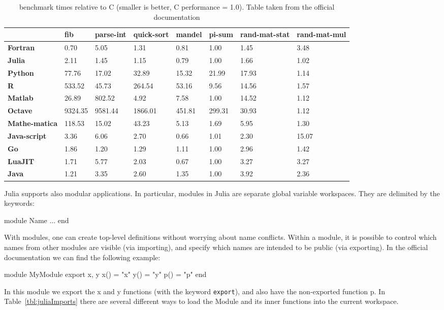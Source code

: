 \begin{table}[htb]
\centering
\caption[benchmark times relative to C]{benchmark times relative to C (smaller is better, C performance = 1.0). Table taken from the official documentation}
\label{tbl:JuliaBenchmark}
\begin{tabular}{p{1.2cm} | p{1.2cm} | p{1.3cm} | p{1.3cm} | p{1.3cm} | p{1cm} | p{1cm} | p{1cm}}
\toprule
&\textbf{fib}& \textbf{parse-int}&\textbf{quick-sort}& \textbf{mandel}&\textbf{pi-sum}& \textbf{rand-mat-stat}& \textbf{rand-mat-mul}\\ \midrule
\textbf{Fortran} 	& 0.70	& 5.05	& 1.31	& 0.81	& 1.00	& 1.45	& 3.48\\ \midrule
\textbf{Julia}		& 2.11	& 1.45	& 1.15	& 0.79	& 1.00	& 1.66	& 1.02\\ \midrule
\textbf{Python}         & 77.76	& 17.02	& 32.89	& 15.32	& 21.99	& 17.93	& 1.14\\ \midrule
\textbf{R}		&533.52	& 45.73	&264.54	& 53.16	& 9.56	& 14.56	& 1.57\\ \midrule
\textbf{Matlab}		& 26.89	&802.52	& 4.92	& 7.58	& 1.00	& 14.52	& 1.12\\ \midrule
\textbf{Octave}         &9324.35&9581.44&1866.01&451.81	&299.31	& 30.93	& 1.12\\ \midrule
\textbf{Mathe-matica}	&118.53	&15.02	& 43.23	& 5.13	& 1.69	& 5.95	& 1.30\\ \midrule
\textbf{Java-script}	& 3.36	& 6.06	& 2.70	& 0.66	& 1.01	& 2.30	& 15.07\\ \midrule
\textbf{Go}		& 1.86	& 1.20	& 1.29	& 1.11	& 1.00	& 2.96	& 1.42\\ \midrule
\textbf{LuaJIT}         & 1.71	& 5.77	& 2.03	& 0.67	& 1.00	& 3.27	& 3.27\\ \midrule
\textbf{Java}	        & 1.21	& 3.35	& 2.60	& 1.35	& 1.00	& 3.92	& 2.36\\ \midrule
\bottomrule
\end{tabular}
\end{table}

Julia supports also modular applications. In particular, modules in Julia are separate global variable workspaces. They are delimited by the keywords:
\begin{julia}
 module Name
 ...
 end
\end{julia}

With modules, one can create top-level definitions without worrying about name conflicts. Within a module, it is possible to control which names from other modules are visible (via importing), and specify which names are intended to be public (via exporting). In the official documentation we can find the following example:
\begin{julia}
 module MyModule
 export x, y
 x() = "x"
 y() = "y"
 p() = "p"
end
\end{julia}
In this module we export the x and y functions (with the keyword \texttt{export}), and also have the non-exported function p. In Table~\ref{tbl:juliaImports} there are several different ways to load the Module and its inner functions into the current workspace.

